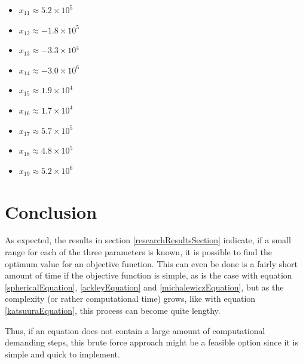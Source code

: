 \documentclass[hidelinks,english,conference]{IEEEtran}
\begin{document}
\begin{itemize}
\begin{itemize}
			\item $x_{11} \approx 5.2 \times 10^{5}$
			\item $x_{12} \approx -1.8 \times 10^{5}$
			\item $x_{13} \approx -3.3 \times 10^{4}$
			\item $x_{14} \approx -3.0 \times 10^{6}$
			\item $x_{15} \approx 1.9 \times 10^{4}$
			\item $x_{16} \approx 1.7 \times 10^{4}$
			\item $x_{17} \approx 5.7 \times 10^{5}$
			\item $x_{18} \approx 4.8 \times 10^{5}$
			\item $x_{19} \approx 5.2 \times 10^{6}$
		\end{itemize}
\end{itemize}

\section{Conclusion}
As expected, the results in section \ref{researchResultsSection} indicate, if a small range for each of the three parameters is known, it is possible to find the optimum value for an objective function. This can even be done is a fairly short amount of time if the objective function is simple, as is the case with equation \ref{sphericalEquation}, \ref{ackleyEquation} and \ref{michalewiczEquation}, but as the complexity (or rather computational time) grows, like with equation \ref{katsuuraEquation}, this process can become quite lengthy.

Thus, if an equation does not contain a large amount of computational demanding steps, this brute force approach might be a feasible option since it is simple and quick to implement.




\end{document}
